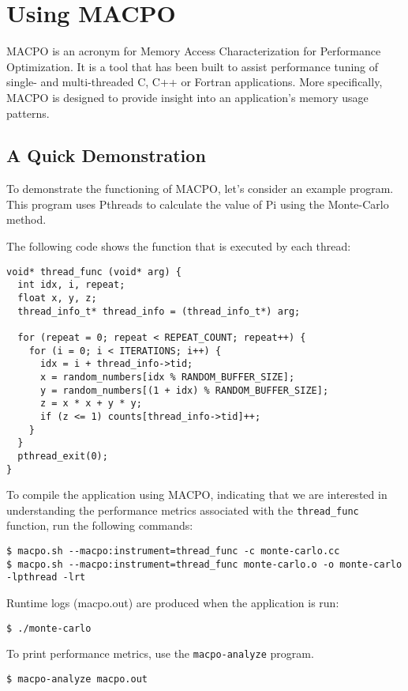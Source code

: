\chapter{Using MACPO}
MACPO is an acronym for Memory Access Characterization for Performance Optimization. It is a tool that has been built to assist performance tuning of single- and multi-threaded C, C++ or Fortran applications. More specifically, MACPO is designed to provide insight into an application's memory usage patterns.

\section{A Quick Demonstration}
To demonstrate the functioning of MACPO, let's consider an example program. This program uses Pthreads to calculate the value of Pi using the Monte-Carlo method.

The following code shows the function that is executed by each thread:

\begin{lstlisting}[breaklines]
void* thread_func (void* arg) {
  int idx, i, repeat;
  float x, y, z;
  thread_info_t* thread_info = (thread_info_t*) arg;

  for (repeat = 0; repeat < REPEAT_COUNT; repeat++) {
    for (i = 0; i < ITERATIONS; i++) {
      idx = i + thread_info->tid;
      x = random_numbers[idx % RANDOM_BUFFER_SIZE];
      y = random_numbers[(1 + idx) % RANDOM_BUFFER_SIZE];
      z = x * x + y * y;
      if (z <= 1) counts[thread_info->tid]++;
    }
  }
  pthread_exit(0);
}
\end{lstlisting}

To compile the application using MACPO, indicating that we are interested in understanding the performance metrics associated with the \texttt{thread\_func} function, run the following commands:
\begin{lstlisting}[breaklines]
$ macpo.sh --macpo:instrument=thread_func -c monte-carlo.cc
$ macpo.sh --macpo:instrument=thread_func monte-carlo.o -o monte-carlo -lpthread -lrt
\end{lstlisting}

Runtime logs (macpo.out) are produced when the application is run:
\begin{lstlisting}[breaklines]
$ ./monte-carlo
\end{lstlisting}

To print performance metrics, use the \texttt{macpo-analyze} program.
\begin{lstlisting}[breaklines]
$ macpo-analyze macpo.out
\end{lstlisting}

